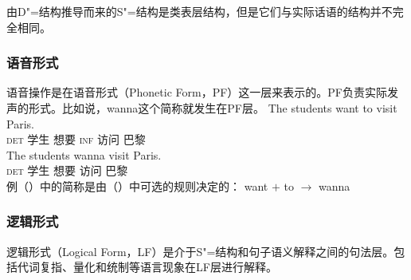 由D"=结构推导而来的S"=结构是类表层结构，但是它们与实际话语的结构并不完全相同。

\subsubsection{语音形式}

语音操作是在语音形式（Phonetic Form，PF）这一层来表示的。PF负责实际发声的形式。比如说，wanna这个简称就发生在PF层\citep[--21]{Chomsky81a}。
\eal
\ex 
\gll The students want to visit Paris.\\
\textsc{det} 学生 想要 \textsc{inf} 访问 巴黎\\
\ex 
\gll The students wanna visit Paris.\\
\textsc{det} 学生 想要 访问 巴黎\\
\zl
例（）中的简称是由（）中可选的规则决定的：
\ea
want $+$ to $\to$ wanna
\z
{}

\subsubsection{逻辑形式}

逻辑形式（Logical Form，LF）是介于S"=结构和句子语义解释之间的句法层。包括代词复指、量化和统制等语言现象在LF层进行解释。

